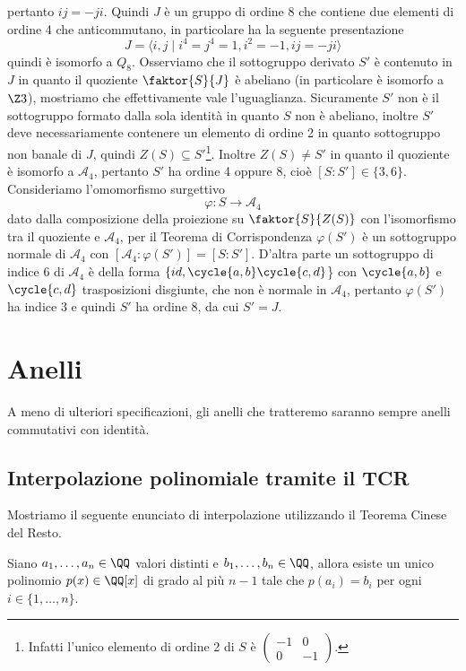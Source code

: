 \documentclass[11pt]{scrartcl}
\begin{document}
	pertanto $ij = -ji$. Quindi $J$ è un gruppo di ordine $8$ che contiene due
	elementi di ordine 4 che anticommutano, in particolare ha la seguente presentazione
	\[
	J = \langle i, j\mid i^4 = j^4 = 1, i^2 = -1, ij = -ji\rangle
	\]
	quindi è isomorfo a $Q_8$. Osserviamo che il sottogruppo derivato $S'$ è 
	contenuto in $J$ in quanto il quoziente $\faktor{S}{J}$ è abeliano (in particolare
	è isomorfo a $\Z3$), mostriamo che effettivamente vale l'uguaglianza. 
	Sicuramente $S'$ non è il sottogruppo formato dalla sola identità in quanto 
	$S$ non è abeliano, inoltre $S'$ deve necessariamente contenere un elemento di 
	ordine 2 in quanto sottogruppo non banale di $J$, quindi $Z(S) \subseteq S'$\footnote{
		Infatti l'unico elemento di ordine 2 di $S$ è $\begin{pmatrix}-1 & 0\\
			0 & -1\end{pmatrix}$.
	}. Inoltre $Z(S) \neq S'$ in quanto il quoziente è isomorfo a $\mathcal{A}_4$,
	pertanto $S'$ ha ordine 4 oppure 8, cioè $[S: S'] \in \{3, 6\}$.
	Consideriamo l'omomorfismo surgettivo 
	\[
	\varphi: S \longrightarrow \mathcal{A}_4
	\]
	dato dalla composizione della proiezione su $\faktor{S}{Z(S)}$ con l'isomorfismo
	tra il quoziente e $\mathcal{A}_4$, per il Teorema di Corrispondenza $\varphi(S')$
	è un sottogruppo normale di $\mathcal{A}_4$ con 
	$[\mathcal{A}_4: \varphi(S')] = [S: S']$. D'altra parte un sottogruppo di 
	indice 6 di $\mathcal{A}_4$ è della forma $\{id, \cycle{a, b}\cycle{c, d}$\}
	con $\cycle{a, b}$ e $\cycle{c, d}$ trasposizioni disgiunte, che non è normale
	in $\mathcal{A}_4$, pertanto $\varphi(S')$ ha indice 3 e quindi $S'$ ha ordine
	8, da cui $S' = J$.
	
	
	\newpage
	
	\section{Anelli}
	
	A meno di ulteriori specificazioni, gli anelli che tratteremo saranno sempre 
	anelli commutativi con identità.
	
	\subsection{Interpolazione polinomiale tramite il TCR}
	
	Mostriamo il seguente enunciato di interpolazione utilizzando il Teorema
	Cinese del Resto.
	
	\begin{proposition}
		Siano $a_1, \ldots, a_n \in \QQ$ valori distinti e $b_1, \ldots, b_n \in \QQ$,
		allora esiste un unico polinomio $p(x) \in \QQ[x]$ di grado al più $n - 1$
		tale che $p(a_i) = b_i$ per ogni $i \in \{1, \ldots, n\}$. 
	\end{proposition}
	
\end{document}
